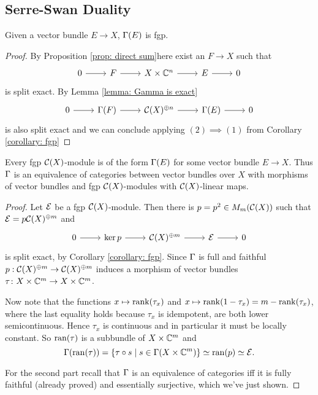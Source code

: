 \subsection{Serre-Swan Duality}
\begin{proposition}
 Given a vector bundle $E\to X$, $\Gamma(E)$ is fgp.
\end{proposition}
\begin{proof}
 By Proposition \eqref{prop: direct sum}here exist an $F\to X$ such that $$\begin{tikzcd} 0\arrow[r] & F\arrow[r] & X\times\C^n\arrow[r] & E\arrow[r] & 0\end{tikzcd}$$
 is split exact. By Lemma \eqref{lemma: Gamma is exact} 
 $$\begin{tikzcd} 0\arrow[r] & \G(F)\arrow[r] & \Co(X)^{\oplus n}\arrow[r] & \G(E)\arrow[r] & 0\end{tikzcd}$$ is also split exact and we can conclude applying $(2)\implies(1)$ from Corollary \eqref{corollary: fgp}
\end{proof}

\begin{theorem}
 Every fgp $\mathcal{C}(X)$-module is of the form $\Gamma(E)$ for some vector bundle $E\to X$. Thus $\Gamma$ is an equivalence of categories between vector bundles over $X$ with morphisms of vector bundles and fgp $\mathcal{C}(X)$-modules with $\mathcal{C}(X)$-linear maps.
\end{theorem}
\begin{proof}
 Let $\mathcal{E}$ be a fgp $\mathcal{C}(X)$-module. Then there is $p=p^2\in M_m(\mathcal{C}(X))$ such that $\mathcal{E}=p\mathcal{C}(X)^{\oplus m}$ and $$\begin{tikzcd} 0\arrow[r] & \ker p\arrow[r] & \Co(X)^{\oplus m}\arrow[r] & \E\arrow[r] & 0\end{tikzcd}$$ is split exact, by Corollary \eqref{corollary: fgp}. Since $\Gamma$ is full and faithful $p:\mathcal{C}(X)^{\oplus m}\to\mathcal{C}(X)^{\oplus m}$ induces a morphism of vector bundles $\tau\colon X\times \mathbb{C}^m\to X\times \mathbb{C}^m$.
 
 \noindent Now note that the functions $x\mapsto\mathrm{rank}(\tau_x)$ and $x\mapsto\mathrm{rank}(1-\tau_x)=m-\mathrm{rank}(\tau_x)$, where the last equality holds because $\tau_x$ is idempotent, are both lower semicontinuous. Hence $\tau_x$ is continuous and in particular it must be locally constant. So $\mathrm{ran}(\tau)$ is a subbundle of $X\times\mathbb{C}^m$ and $$\Gamma(\mathrm{ran}(\tau))=\{\tau\circ s\mid s\in\Gamma(X\times \mathbb{C}^m)\}\simeq\mathrm{ran}(p)\simeq\mathcal{E}.$$
 
 \noindent For the second part recall that $\Gamma$ is an equivalence of categories iff it is fully faithful (already proved) and essentially surjective, which we've just shown.
 
 \noindent {}
\end{proof}